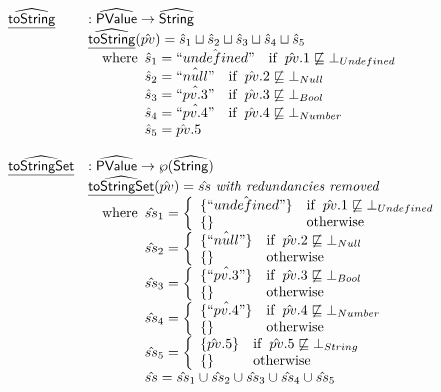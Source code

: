 \[\begin{array}{ll}
\widehat{\underline{\sf toString}} & : \widehat{\mbox{\textsf{PValue}}} \rightarrow \widehat{\mbox{\textsf{String}}} \\
& \widehat{\underline{\sf toString}}(\hat{pv})
  = \hat{s}_1\sqcup\hat{s}_2\sqcup\hat{s}_3\sqcup\hat{s}_4\sqcup\hat{s}_5\\
& \quad{\rm where}\begin{array}[t]{l}
  \hat{s}_1 = \hat{``undefined"}\quad{\rm if}\begin{array}[t]{l}\hat{pv}.1\not\sqsubseteq\bot_{Undefined}\end{array} \\
  \hat{s}_2 = \hat{``null"}\quad{\rm if}\begin{array}[t]{l}\hat{pv}.2\not\sqsubseteq\bot_{Null}\end{array} \\
  \hat{s}_3 = \hat{``pv.3"}\quad{\rm if}\begin{array}[t]{l}\hat{pv}.3\not\sqsubseteq\bot_{Bool}\end{array} \\
  \hat{s}_4 = \hat{``pv.4"}\quad{\rm if}\begin{array}[t]{l}\hat{pv}.4\not\sqsubseteq\bot_{Number}\end{array} \\
  \hat{s}_5 = \hat{pv}.5\\
\end{array}\\
\\

\widehat{\underline{\sf toStringSet}} & : \widehat{\mbox{\textsf{PValue}}} \rightarrow \wp(\widehat{\mbox{\textsf{String}}}) \\
& \widehat{\underline{\sf toStringSet}}(\hat{pv})
  = \hat{ss} ~ \textit{with redundancies removed}\\
& \quad{\rm where}\begin{array}[t]{l}
  \hat{ss}_1 = 
    \left\{\begin{array}{ll}
      \{ \hat{``undefined"} \} & {\rm if}\begin{array}[t]{l}\hat{pv}.1\not\sqsubseteq\bot_{Undefined}\end{array} \\
      \{\} & {\rm otherwise} \\
    \end{array}\right. \\
  \hat{ss}_2 = 
    \left\{\begin{array}{ll}
      \{ \hat{``null"} \} & {\rm if}\begin{array}[t]{l}\hat{pv}.2\not\sqsubseteq\bot_{Null}\end{array} \\
      \{\} & {\rm otherwise} \\
    \end{array}\right. \\
  \hat{ss}_3 = 
    \left\{\begin{array}{ll}
      \{ \hat{``pv.3"} \} & {\rm if}\begin{array}[t]{l}\hat{pv}.3\not\sqsubseteq\bot_{Bool}\end{array} \\
      \{\} & {\rm otherwise} \\
    \end{array}\right. \\
  \hat{ss}_4 = 
    \left\{\begin{array}{ll}
      \{ \hat{``pv.4"} \} & {\rm if}\begin{array}[t]{l}\hat{pv}.4\not\sqsubseteq\bot_{Number}\end{array} \\
      \{\} & {\rm otherwise} \\
    \end{array}\right. \\
  \hat{ss}_5 = 
    \left\{\begin{array}{ll}
      \{ \hat{pv}.5 \} & {\rm if}\begin{array}[t]{l}\hat{pv}.5\not\sqsubseteq\bot_{String}\end{array} \\
      \{\} & {\rm otherwise} \\
    \end{array}\right. \\
  \hat{ss} = \hat{ss}_1\cup\hat{ss}_2\cup\hat{ss}_3\cup\hat{ss}_4\cup\hat{ss}_5
\end{array}\\
\\
\end{array}
\]

